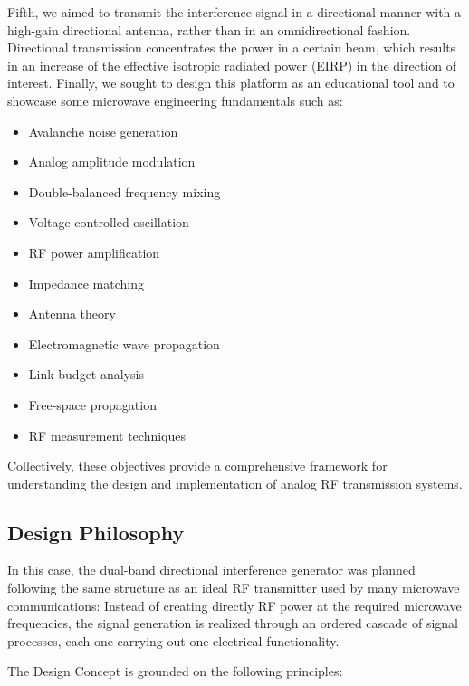 \documentclass[12pt,a4paper]{report}
\begin{document}
	
	Fifth, we aimed to transmit the interference signal in a directional manner with a high-gain directional antenna, rather than in an omnidirectional fashion. Directional transmission concentrates the power in a certain beam, which results in an increase of the effective isotropic radiated power (EIRP) in the direction of interest.
	Finally, we sought to design this platform as an educational tool and to showcase some microwave engineering fundamentals such as:
	\vspace{0.5cm}
	\begin{itemize}
		\item[\textbullet] Avalanche noise generation
		\item[\textbullet] Analog amplitude modulation
		\item[\textbullet] Double-balanced frequency mixing
		\item[\textbullet] Voltage-controlled oscillation
		\item[\textbullet] RF power amplification
		\item[\textbullet] Impedance matching
		\item[\textbullet] Antenna theory
		\item[\textbullet] Electromagnetic wave propagation
		\item[\textbullet] Link budget analysis
		\item[\textbullet] Free-space propagation
		\item[\textbullet] RF measurement techniques
	\end{itemize}
	\vspace{0.5cm}
	Collectively, these objectives provide a comprehensive framework for understanding the design and implementation of analog RF transmission systems.
	\subsection{Design Philosophy}
	In this case, the dual-band directional interference generator was planned following the same structure as an ideal RF transmitter used by many microwave communications: Instead of creating directly RF power at the required microwave frequencies, the signal generation is realized through an ordered cascade of signal processes, each one carrying out one electrical functionality.
	\vspace{0.5cm}
			
		The Design Concept is grounded on the following principles:
		
\end{document}
